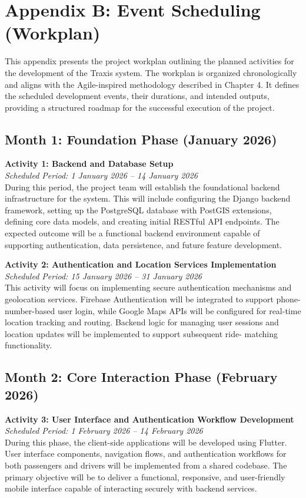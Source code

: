\section*{Appendix B: Event Scheduling (Workplan)}

This appendix presents the project workplan outlining the planned activities for
the development of the Traxis system. The workplan is organized chronologically
and aligns with the Agile-inspired methodology described in Chapter 4. It
defines the scheduled development events, their durations, and intended outputs,
providing a structured roadmap for the successful execution of the project.


\subsection*{Month 1: Foundation Phase (January 2026)}

\textbf{Activity 1: Backend and Database Setup} \\
\textit{Scheduled Period: 1 January 2026 – 14 January 2026} \\
During this period, the project team will establish the foundational backend
infrastructure for the system. This will include configuring the Django backend
framework, setting up the PostgreSQL database with PostGIS extensions, defining
core data models, and creating initial RESTful API endpoints. The expected
outcome will be a functional backend environment capable of supporting
authentication, data persistence, and future feature development.


\textbf{Activity 2: Authentication and Location Services Implementation} \\
\textit{Scheduled Period: 15 January 2026 – 31 January 2026} \\
This activity will focus on implementing secure authentication mechanisms and
geolocation services. Firebase Authentication will be integrated to support
phone-number-based user login, while Google Maps APIs will be configured for
real-time location tracking and routing. Backend logic for managing user
sessions and location updates will be implemented to support subsequent ride-
matching functionality.


\subsection*{Month 2: Core Interaction Phase (February 2026)}

\textbf{Activity 3: User Interface and Authentication Workflow Development} \\
\textit{Scheduled Period: 1 February 2026 – 14 February 2026} \\
During this phase, the client-side applications will be developed using Flutter.
User interface components, navigation flows, and authentication workflows for
both passengers and drivers will be implemented from a shared codebase. The
primary objective will be to deliver a functional, responsive, and user-friendly
mobile interface capable of interacting securely with backend services.


